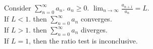 \documentclass[border=6pt]{standalone}
\newcommand{\ds}{\displaystyle}
\begin{document}
\parbox{3in}{Consider $\ds\sum_{n=0}^\infty a_n$.  $a_n \geq 0$.
$\ds\lim_{n\to \infty} \frac{a_{n+1}}{a_n}=L.$\\
If $L<1$. then $\ds\sum_{n=0}^\infty a_n$ converges. \\
If $L>1$. then $\ds\sum_{n=0}^\infty a_n$ diverges. \\
If $L=1$, then the ratio test is inconclusive.}
\end{document}
